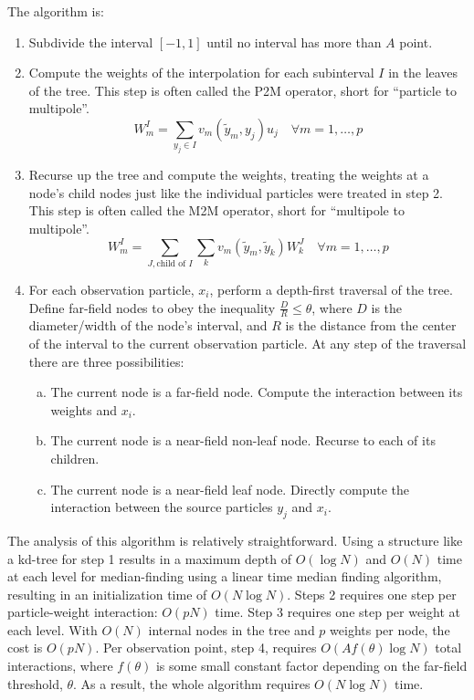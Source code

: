 \documentclass[10pt]{article}
\begin{document}
The algorithm is:
\begin{enumerate}
    \item Subdivide the interval $[-1,1]$ until no interval has more than $A$ point.
    \item Compute the weights of the interpolation for each subinterval $I$ in the leaves of the tree. This step is often called the P2M operator, short for ``particle to multipole''.
        \begin{equation}
            W_{m}^I = \sum_{y_j \in I} v_m(\tilde{y}_m, y_j) u_j \quad \forall m = 1,\dots,p
        \end{equation}
    \item Recurse up the tree and compute the weights, treating the weights at a node's child nodes just like the individual particles were treated in step 2. This step is often called the M2M operator, short for ``multipole to multipole''.
        \begin{equation}
            W_{m}^I = \sum_{J, \textrm{child of } I}\sum_{k} v_m(\tilde{y}_m, \tilde{y}_k) W_{k}^J \quad \forall m = 1,\dots,p
        \end{equation}
    \item For each observation particle, $x_i$, perform a depth-first traversal of the tree. Define far-field nodes to obey the inequality $\frac{D}{R} \leq \theta$, where $D$ is the diameter/width of the node's interval, and $R$ is the distance from the center of the interval to the current observation particle. At any step of the traversal there are three possibilities:
        \begin{enumerate}[(a)]
            \item The current node is a far-field node. Compute the interaction between its weights and $x_i$.
            \item The current node is a near-field non-leaf node. Recurse to each of its children.
            \item The current node is a near-field leaf node. Directly compute the interaction between the source particles $y_j$ and $x_i$.
        \end{enumerate}
\end{enumerate}

The analysis of this algorithm is relatively straightforward. Using a structure like a kd-tree for step 1 results in a maximum depth of $O(\log{N})$ and $O(N)$ time at each level for median-finding using a linear time median finding algorithm, resulting in an initialization time of $O(N\log{N})$. Steps 2 requires one step per particle-weight interaction: $O(pN)$ time. Step 3 requires one step per weight at each level. With $O(N)$ internal nodes in the tree and $p$ weights per node, the cost is $O(pN)$. Per observation point, step 4, requires $O(A f(\theta)\log{N})$ total interactions, where $f(\theta)$ is some small constant factor depending on the far-field threshold, $\theta$. As a result, the whole algorithm requires $O(N\log{N})$ time.
\end{document}
